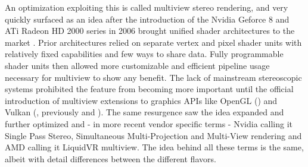 An optimization exploiting this is called multiview stereo rendering, and very quickly surfaced as an idea after the introduction of the Nvidia Geforce 8 and ATi Radeon HD 2000 series in 2006 brought unified shader architectures to the market \cite{Lindholm.2008}\cite{Sommefeldt.2007}. Prior architectures relied on separate vertex and pixel shader units with relatively fixed capabilities and few ways to share data. Fully programmable shader units then allowed more customizable and efficient pipeline usage necessary for multiview to show any benefit. 
The lack of mainstream stereoscopic systems prohibited the feature from becoming more important until the official introduction of multiview extensions to graphics APIs like OpenGL () and Vulkan (, previously  and ). 
The same resurgence saw the idea expanded and further optimized and - in more recent vendor specific terms - Nvidia calling it Single Pass Stereo\cite{Cantlay.2016}, Simultaneous Multi-Projection\cite{Smith.2016} and Multi-View\cite{Bhonde.2018} rendering and AMD calling it LiquidVR multiview\cite{Gallagher.2016}\cite{Jez.2017}. The idea behind all these terms is the same, albeit with detail differences between the different flavors. \\

